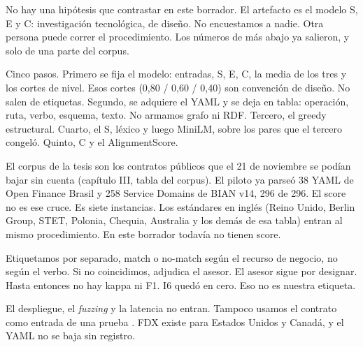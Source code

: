No hay una hipótesis que contrastar en este borrador. El artefacto es el modelo S, E y C: investigación tecnológica, de diseño. No encuestamos a nadie. Otra persona puede correr el procedimiento. Los números de más abajo ya salieron, y solo de una parte del corpus.

Cinco pasos. Primero se fija el modelo: entradas, S, E, C, la media de los tres y los cortes de nivel. Esos cortes (0,80 / 0,60 / 0,40) son convención de diseño. No salen de etiquetas. Segundo, se adquiere el YAML y se deja en tabla: operación, ruta, verbo, esquema, texto. No armamos grafo ni RDF. Tercero, el greedy estructural. Cuarto, el S, léxico y luego MiniLM, sobre los pares que el tercero congeló. Quinto, C y el AlignmentScore.

El corpus de la tesis son los contratos públicos que el 21 de noviembre se podían bajar sin cuenta (capítulo III, tabla del corpus). El piloto ya parseó 38 YAML de Open Finance Brasil y 258 Service Domains de BIAN v14, 296 de 296. El score no es ese cruce. Es siete instancias. Los estándares en inglés (Reino Unido, Berlin Group, STET, Polonia, Chequia, Australia y los demás de esa tabla) entran al mismo procedimiento. En este borrador todavía no tienen score.

Etiquetamos por separado, match o no-match según el recurso de negocio, no según el verbo. Si no coincidimos, adjudica el asesor. El asesor sigue por designar. Hasta entonces no hay kappa ni F1. I6 quedó en cero. Eso no es nuestra etiqueta.

El despliegue, el \textit{fuzzing} y la latencia no entran. Tampoco usamos el contrato como entrada de una prueba \cite{Ehsan2022,Golmohammadi2024}. FDX existe para Estados Unidos y Canadá, y el YAML no se baja sin registro.


